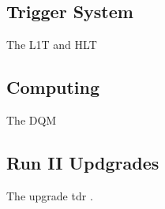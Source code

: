 \subsection{Trigger System}
\label{SUBSECTION:ExperimentalApparatus_CMS_Trigger}

The \gls{L1T} and \gls{HLT}

\subsection{Computing}
\label{SUBSECTION:ExperimentalApparatus_CMS_Computing}

The \gls{DQM} 

\subsection{Run II Updgrades}
\label{SUBSECTION:ExperimentalApparatus_CMS_RUNII}

The upgrade tdr \cite{CMSL1UpgradeTDR}.
